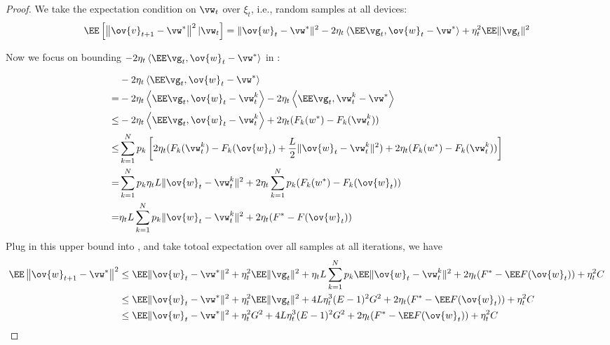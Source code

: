 \begin{proof}
We take the expectation condition on $\vw_t$ over $\xi_t$, i.e., random samples at all devices:
\begin{align}
\EE\left[\left\|\ov{v}_{t+1}-\vw^{*}\right\|^2| \vw_{t}\right]=\|\ov{w}_{t}-\vw^{*}\|^{2}-2 \eta_{t} \left<\EE \vg_{t}, \ov{w}_{t}-\vw^{*} \right> +\eta_{t}^{2} \EE\| \vg_{t} \|^{2}
\label{eq:expandsgd}
\end{align}

Now we focus on bounding $-2 \eta_{t} \left< \EE \vg_{t}, \ov{w}_{t}-\vw^{*}\right>$ in \eq{\ref{eq:expandsgd}}: 

\begin{align*}
	& -2 \eta_{t} \left<\EE \vg_{t}, \ov{w}_{t}-\vw^{*}\right> \\
 =  & -2 \eta_{t} \left<\EE \vg_{t}, \ov{w}_{t}- \vw^{k}_t \right> -2 \eta_{t} \left<\EE \vg_{t}, \vw^{k}_t - \vw^{*}\right>\\
 \leq & -2 \eta_{t} \left<\EE \vg_{t}, \ov{w}_{t}- \vw^{k}_t \right> + 2 \eta_{t} (F_k(w^*) - F_k(\vw^{k}_t))\\
 \leq &\sum_{k=1}^N p_k \left[2 \eta_{t} (F_k(\vw^{k}_t) - F_k(\ov{w}_t) + \frac{L}{2} \|\ov{w}_t - \vw^{k}_t\|^2 ) + 2 \eta_{t} (F_k(w^*) - F_k(\vw^{k}_t))\right]\\
 = & \sum_{k=1}^N p_k \eta_t L \|\ov{w}_t - \vw^{k}_t\|^2 + 2 \eta_{t} \sum_{k=1}^N p_k (F_k(w^*) - F_k(\ov{w}_t))\\
 = &  \eta_t L \sum_{k=1}^N p_k \|\ov{w}_t - \vw^{k}_t\|^2 + 2 \eta_{t} (F^* - F(\ov{w}_t))
\end{align*}
Plug in this upper bound into \eq{\ref{eq:expandsgd}}, \eq{\ref{eq:sgdcvxsmth1}} and take totoal expectation over all samples at all iterations, we have
\begin{align}
\EE\left\|\ov{w}_{t+1}-\vw^{*}\right\|^2 &\leq \EE\|\ov{w}_{t}-\vw^{*}\|^{2}+\eta_{t}^{2} \EE\| \vg_{t} \|^{2} + \eta_t L \sum_{k=1}^N p_k \EE \|\ov{w}_t - \vw^{k}_t\|^2 + 2 \eta_{t} (F^* - \EE F(\ov{w}_t)) + \eta_t^2 C\\
&\leq\EE \|\ov{w}_{t}-\vw^{*}\|^{2}+\eta_{t}^{2} \EE\| \vg_{t} \|^{2} +  4L\eta_t^3(E-1)^2 G^2 + 2 \eta_{t} (F^* - \EE F(\ov{w}_t)) + \eta_t^2 C\\
&\leq \EE\|\ov{w}_{t}-\vw^{*}\|^{2}+\eta_{t}^{2} G^2 +  4L\eta_t^3(E-1)^2 G^2 + 2 \eta_{t} (F^* - \EE F(\ov{w}_t))+\eta_t^2 C \label{eq:cvxsgd1}
\end{align}


\end{proof}
